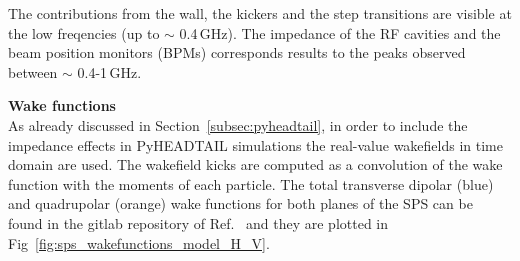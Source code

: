  The contributions from the wall, the kickers and the step transitions are visible at the low freqencies (up to $\sim$ 0.4\,GHz). The impedance of the RF cavities and the beam position monitors (BPMs) corresponds results to the peaks observed between $\sim$ 0.4-1\,GHz. 

\normalsize{\textbf{Wake functions}}\\
As already discussed in Section~\ref{subsec:pyheadtail}, in order to include the impedance effects in PyHEADTAIL simulations the real-value wakefields in time domain are used. The wakefield kicks are computed as a convolution of the wake function with the moments of each particle. The total transverse dipolar (blue) and quadrupolar (orange) wake functions for both planes of the SPS can be found in the gitlab repository of Ref.~\cite{sps_impedance_model_git} and they are plotted in Fig~\ref{fig:sps_wakefunctions_model_H_V}.

